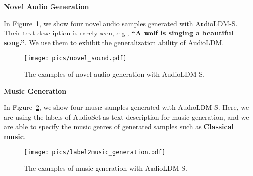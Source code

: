 \documentclass{article}
\begin{document}
\textbf{Novel Audio Generation}

In Figure~\ref{fig:novel-audio}, we show four novel audio samples generated with AudioLDM-S. Their text description is rarely seen, e.g., \textbf{``A wolf is singing a beautiful song.''}. We use them to exhibit the generalization ability of AudioLDM.
\vspace{0.3cm}

\begin{figure}[H]
    \centering
    \texttt{[image: pics/novel\_sound.pdf]}
    \caption{The examples of novel audio generation with AudioLDM-S.}
    \label{fig:novel-audio}
\end{figure}

\newpage

\textbf{Music Generation}

In Figure~\ref{fig:demo-audioset-music}, we show four music samples generated with AudioLDM-S. Here, we are using the labels of AudioSet as text description for music generation, and we are able to specify the music genres of generated samples such as \textbf{Classical music}.


\begin{figure}[H]
    \centering
    \texttt{[image: pics/label2music\_generation.pdf]}
    \caption{The examples of music generation with AudioLDM-S.}
    \label{fig:demo-audioset-music}
\end{figure}










\newpage
\end{document}
